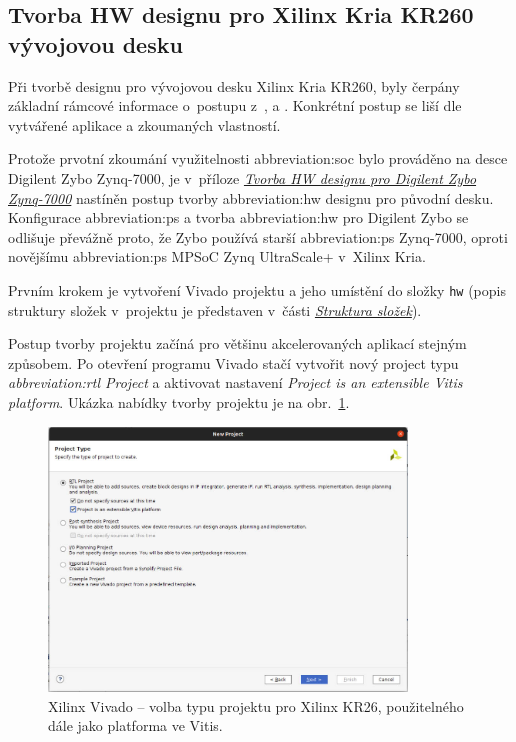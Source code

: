 \documentclass[a4paper, twoside, 11pt]{article}
\begin{document}
		
		\subsection{Tvorba HW designu pro Xilinx Kria KR260 vývojovou desku}\label{subsec:tvorba-hw-designu-pro-xilinx-kria-kr260}
				Při tvorbě designu pro vývojovou desku Xilinx Kria KR260, byly čerpány základní rámcové informace o~postupu z~\cite{hackster-getting-started-with-the-kria-kr260-in-petalinux}, \cite{hackster-add-peripherial-support-to-kria-kr260-vivado} a \cite{hackster-getting-started-with-the-kria-kr260-in-vivado}. Konkrétní postup se liší dle vytvářené aplikace a zkoumaných vlastností.\par
				Protože prvotní zkoumání využitelnosti \gls{abbreviation:soc} bylo prováděno na desce Digilent Zybo Zynq-7000, je v~příloze \hyperref[sec:appendicies:-tvorba-hw-designu-pro-digilent-zybo-zynq-7000]{\textit{Tvorba HW designu pro Digilent Zybo Zynq-7000}} nastíněn postup tvorby \gls{abbreviation:hw} designu pro původní desku. Konfigurace \gls{abbreviation:ps} a tvorba \gls{abbreviation:hw} pro Digilent Zybo se odlišuje převážně proto, že Zybo používá starší \gls{abbreviation:ps} Zynq-7000, oproti novějšímu \gls{abbreviation:ps} MPSoC Zynq UltraScale+ v~Xilinx Kria.\par
				Prvním krokem je vytvoření Vivado projektu a jeho umístění do složky \texttt{hw} (popis struktury složek v~projektu je představen v~části \hyperref[sec:struktura-slozek]{\textit{Struktura složek}}).\par
				Postup tvorby projektu začíná pro většinu akcelerovaných aplikací stejným způsobem. Po otevření programu Vivado stačí vytvořit nový project typu \textit{\gls{abbreviation:rtl} Project} a aktivovat nastavení \textit{Project is an extensible Vitis platform}. Ukázka nabídky tvorby projektu je na obr.~\ref{fig:kr26-xilix-vivado-flow-01}.


				\begin{figure}[htbp!]
					\centering
					\includegraphics[width=0.85\textwidth]{src/png/kr26-xilinx-vivado-flow/kr26-xilix-vivado-flow-01.jpg}
					\caption{Xilinx Vivado – volba typu projektu pro Xilinx KR26, použitelného dále jako platforma ve Vitis.}
					\label{fig:kr26-xilix-vivado-flow-01}
				\end{figure}
\end{document}
